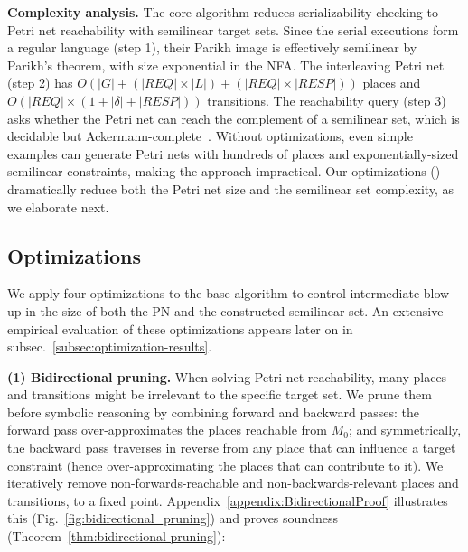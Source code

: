 \medskip
\noindent
\textbf{Complexity analysis.}
The core algorithm reduces serializability checking to Petri net reachability with semilinear target sets. 
Since the serial executions form a regular language (step 1), their Parikh image is effectively semilinear by Parikh's theorem, with size exponential in the NFA.
The interleaving Petri net (step 2) has $O(|G| + (|\mathit{REQ}| \times |L|) + (|\mathit{REQ}| \times |\mathit{RESP}|))$ places and $O(|\mathit{REQ}|\times (1+ |\delta| + |\mathit{RESP}|))$ transitions.
The reachability query (step 3) asks whether the Petri net can reach the complement of a semilinear set, which is decidable but Ackermann-complete~\cite{CzWo22}.
Without optimizations, even simple examples can generate Petri nets with hundreds of places and exponentially-sized semilinear constraints, making the approach impractical.
Our optimizations () dramatically reduce both the Petri net size and the semilinear set complexity, as we elaborate next.


%


\subsection{Optimizations}
\label{sec:optimizations}


We apply four optimizations to the base algorithm to control intermediate blow‐up in the size of both the PN and the constructed semilinear set. 
%
An extensive empirical evaluation of these optimizations appears later on in subsec.~\ref{subsec:optimization-results}.

\medskip
\noindent
\textbf{(1) Bidirectional pruning.}  
When solving Petri net reachability, many places and transitions might be irrelevant to the specific target set.  
	We prune them before symbolic reasoning by combining forward and backward passes:  
	the forward pass over-approximates the places reachable from $M_0$; and symmetrically,   
	the backward pass traverses in reverse from any place that can influence a target constraint (hence over-approximating the places that can contribute to it).
	We iteratively remove non-forwards-reachable and
	non-backwards-relevant places and transitions, to a fixed point.  
	Appendix~\ref{appendix:BidirectionalProof} illustrates this (Fig.~\ref{fig:bidirectional_pruning}) and proves soundness (Theorem~\ref{thm:bidirectional-pruning}):


